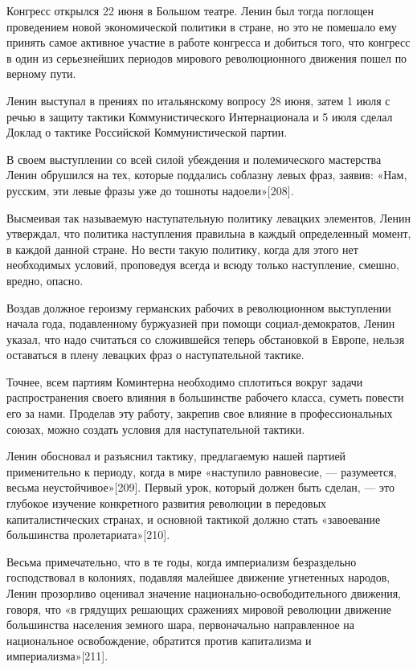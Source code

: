 \documentclass[12pt, a4paper, openany]{book}
\begin{document}
Конгресс открылся 22 июня в Большом театре. Ленин был тогда поглощен проведением новой экономической политики в стране, но это не помешало ему принять самое активное участие в работе конгресса и добиться того, что конгресс в один из серьезнейших периодов мирового революционного движения пошел по верному пути.

Ленин выступал в прениях по итальянскому вопросу 28 июня, затем 1 июля с речью в защиту тактики Коммунистического Интернационала и 5 июля сделал Доклад о тактике Российской Коммунистической партии.

В своем выступлении со всей силой убеждения и полемического мастерства Ленин обрушился на тех, которые поддались соблазну левых фраз, заявив: «Нам, русским, эти левые фразы уже до тошноты надоели»[208].

Высмеивая так называемую наступательную политику левацких элементов, Ленин утверждал, что политика наступления правильна в каждый определенный момент, в каждой данной стране. Но вести такую политику, когда для этого нет необходимых условий, проповедуя всегда и всюду только наступление, смешно, вредно, опасно.

Воздав должное героизму германских рабочих в революционном выступлении начала года, подавленному буржуазией при помощи социал-демократов, Ленин указал, что надо считаться со сложившейся теперь обстановкой в Европе, нельзя оставаться в плену левацких фраз о наступательной тактике.

Точнее, всем партиям Коминтерна необходимо сплотиться вокруг задачи распространения своего влияния в большинстве рабочего класса, суметь повести его за нами. Проделав эту работу, закрепив свое влияние в профессиональных союзах, можно создать условия для наступательной тактики.

Ленин обосновал и разъяснил тактику, предлагаемую нашей партией применительно к периоду, когда в мире «наступило равновесие, — разумеется, весьма неустойчивое»[209]. Первый урок, который должен быть сделан, — это глубокое изучение конкретного развития революции в передовых капиталистических странах, и основной тактикой должно стать «завоевание большинства пролетариата»[210].

Весьма примечательно, что в те годы, когда империализм безраздельно господствовал в колониях, подавляя малейшее движение угнетенных народов, Ленин прозорливо оценивал значение национально-освободительного движения, говоря, что «в грядущих решающих сражениях мировой революции движение большинства населения земного шара, первоначально направленное на национальное освобождение, обратится против капитализма и империализма»[211].
\end{document}
